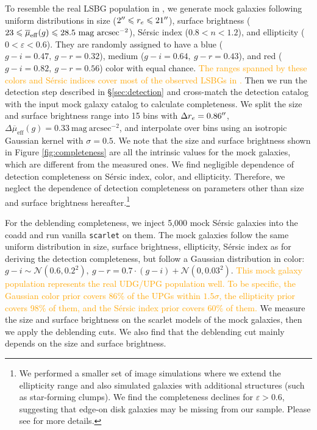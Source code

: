 \documentclass[twocolumn,astrosymb,twocolappendix,linenumbers]{aastex631}
\newcommand{\sbunit}{\mathrm{mag\ arcsec}^{-2}}
\newcommand{\sbeff}{\overline{\mu}_{\mathrm{eff}}(g)}
\newcommand{\emphasize}{\textcolor{orange}}
\newcommand{\code}[1]{\texttt{#1}}
\newcommand{\sersic}{S\'ersic}
\begin{document}
\begin{CJK*}{UTF8}{gbsn}
To resemble the real LSBG population in , we generate mock galaxies following uniform distributions in size ($2\mbox{$^{\prime\prime}$} \leqslant r_{e} \leqslant 21\mbox{$^{\prime\prime}$}$), surface brightness ($23 \leqslant \overline{\mu}_{\rm eff}(g) \leqslant 28.5\ \mathrm{mag\ arcsec^{-2}}$), \sersic{} index ($0.8 < n < 1.2$), and ellipticity ($0 < \varepsilon < 0.6$). They are randomly assigned to have a blue ($g-i=0.47,\ g-r=0.32$), medium ($g-i=0.64,\ g-r=0.43$), and red ($g-i=0.82,\ g-r=0.56$) color with equal chance. \emphasize{The ranges spanned by these colors and \sersic{} indices cover most of the observed LSBGs in .} Then we run the detection step described in \S \ref{sec:detection} and cross-match the detection catalog with the input mock galaxy catalog to calculate completeness. We split the size and surface brightness range into 15 bins with $\Delta r_e = 0.86\mbox{$^{\prime\prime}$}$, $\Delta \sbeff = 0.33\ \sbunit$, and interpolate over bins using an isotropic Gaussian kernel with $\sigma = 0.5$. We note that the size and surface brightness shown in Figure \ref{fig:completeness} are all the intrinsic values for the mock galaxies, which are different from the measured ones. We find negligible dependence of detection completeness on \sersic{} index, color, and ellipticity. Therefore, we neglect the dependence of detection completeness on parameters other than size and surface brightness hereafter.\footnote{We performed a smaller set of image simulations where we extend the ellipticity range and also simulated galaxies with additional structures (such as star-forming clumps). We find the completeness declines for $\varepsilon > 0.6$, suggesting that edge-on disk galaxies may be missing from our sample. Please see \citet{Greene2022} for more details.}

For the deblending completeness, we inject 5,000 mock \sersic{} galaxies into the coadd and run vanilla \code{scarlet} on them. The mock galaxies follow the same uniform distribution in size, surface brightness, ellipticity, \sersic{} index as for deriving the detection completeness, but follow a Gaussian distribution in color: $g-i \sim \mathcal{N}(0.6, 0.2^2),\ g-r = 0.7 \cdot (g-i) + \mathcal{N}(0, 0.03^2)$. \emphasize{This mock galaxy population represents the real UDG/UPG population well. To be specific, the Gaussian color prior covers 86\% of the UPGs within $1.5\sigma$, the ellipticity prior covers 98\% of them, and the \sersic{} index prior covers 60\% of them.}
We measure the size and surface brightness on the scarlet models of the mock galaxies, then we apply the deblending cuts. We also find that the deblending cut mainly depends on the size and surface brightness. 


\end{CJK*}
\end{document}

